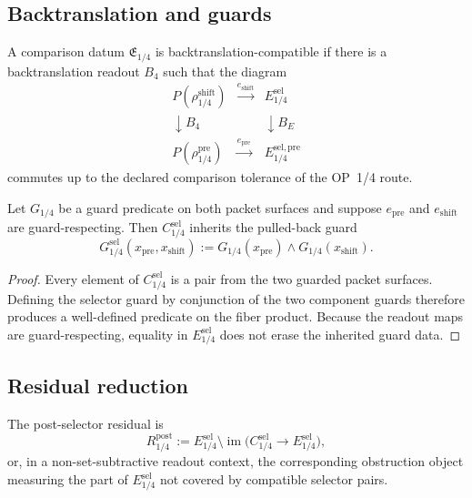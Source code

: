 \subsection{Backtranslation and guards}
\label{subsec:v410r07-backtranslation-and-guards}

\begin{definition}
\label{def:v410r07-backtranslation-compatible-comparison-datum}
A comparison datum \(\mathfrak E_{1/4}\) is backtranslation-compatible if
there is a backtranslation readout \(B_4\) such that the diagram
\[
\begin{array}{ccc}
P(\rho_{1/4}^{\mathrm{shift}}) & \xrightarrow{e_{\mathrm{shift}}}
& E_{1/4}^{\mathrm{sel}}\\
\downarrow B_4 && \downarrow B_E\\
P(\rho_{1/4}^{\mathrm{pre}}) & \xrightarrow{e_{\mathrm{pre}}}
& E_{1/4}^{\mathrm{sel,pre}}
\end{array}
\]
commutes up to the declared comparison tolerance of the OP~1/4 route.
\end{definition}

\begin{lemma}
\label{lem:v410r07-guard-pullback}
Let \(G_{1/4}\) be a guard predicate on both packet surfaces and suppose
\(e_{\mathrm{pre}}\) and \(e_{\mathrm{shift}}\) are guard-respecting. Then
\(C_{1/4}^{\mathrm{sel}}\) inherits the pulled-back guard
\[
 G_{1/4}^{\mathrm{sel}}(x_{\mathrm{pre}},x_{\mathrm{shift}})
 :=
 G_{1/4}(x_{\mathrm{pre}})
 \wedge
 G_{1/4}(x_{\mathrm{shift}}).
\]
\end{lemma}

\begin{proof}
Every element of \(C_{1/4}^{\mathrm{sel}}\) is a pair from the two guarded
packet surfaces. Defining the selector guard by conjunction of the two
component guards therefore produces a well-defined predicate on the fiber
product. Because the readout maps are guard-respecting, equality in
\(E_{1/4}^{\mathrm{sel}}\) does not erase the inherited guard data.
\end{proof}

\subsection{Residual reduction}
\label{subsec:v410r07-residual-reduction}

\begin{definition}
\label{def:v410r07-post-selector-residual}
The post-selector residual is
\[
 R_{1/4}^{\mathrm{post}}
 :=
 E_{1/4}^{\mathrm{sel}}
 \setminus
 \operatorname{im}
 \bigl(C_{1/4}^{\mathrm{sel}}\to E_{1/4}^{\mathrm{sel}}\bigr),
\]
or, in a non-set-subtractive readout context, the corresponding obstruction
object measuring the part of \(E_{1/4}^{\mathrm{sel}}\) not covered by
compatible selector pairs.
\end{definition}

